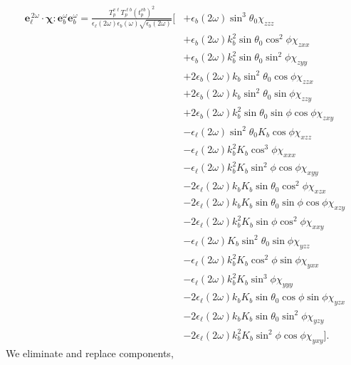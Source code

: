 \begin{equation*}
\begin{split}
\mathbf{e}^{\,2\omega}_{\ell}\cdot
\boldsymbol{\chi}:\mathbf{e}^{\omega}_{b}\mathbf{e}^{\omega}_{b} = 
\frac{T^{v\ell}_{p}T^{\ell b}_{p}\left(t^{vb}_{p}\right)^{2}}
     {\epsilon_{\ell}({2\omega})\epsilon_{b}(\omega)\sqrt{\epsilon_{b}(2\omega)}}
\bigg[
&+ \epsilon_{b}(2\omega)\sin^{3}\theta_{0}\chi_{zzz}\\
&+ \epsilon_{b}(2\omega)k^{2}_{b}\sin\theta_{0}\cos^{2}\phi\chi_{zxx}\\
&+ \epsilon_{b}(2\omega)k^{2}_{b}\sin\theta_{0}\sin^{2}\phi\chi_{zyy}\\
&+ 2\epsilon_{b}(2\omega)k_{b}\sin^{2}\theta_{0}\cos\phi\chi_{zzx}\\
&+ 2\epsilon_{b}(2\omega)k_{b}\sin^{2}\theta_{0}\sin\phi\chi_{zzy}\\
&+ 2\epsilon_{b}(2\omega)k^{2}_{b}\sin\theta_{0}\sin\phi\cos\phi\chi_{zxy}\\
&- \epsilon_{\ell}(2\omega)\sin^{2}\theta_{0}K_{b}\cos\phi\chi_{xzz}\\
&- \epsilon_{\ell}(2\omega)k^{2}_{b}K_{b}\cos^{3}\phi\chi_{xxx}\\
&- \epsilon_{\ell}(2\omega)k^{2}_{b}K_{b}\sin^{2}\phi\cos\phi\chi_{xyy}\\
&- 2\epsilon_{\ell}(2\omega)k_{b}K_{b}\sin\theta_{0}\cos^{2}\phi\chi_{xzx}\\
&- 2\epsilon_{\ell}(2\omega)k_{b}K_{b}\sin\theta_{0}\sin\phi\cos\phi\chi_{xzy}\\
&- 2\epsilon_{\ell}(2\omega)k^{2}_{b}K_{b}\sin\phi\cos^{2}\phi\chi_{xxy}\\
&- \epsilon_{\ell}(2\omega)K_{b}\sin^{2}\theta_{0}\sin\phi\chi_{yzz}\\
&- \epsilon_{\ell}(2\omega)k^{2}_{b}K_{b}\cos^{2}\phi\sin\phi\chi_{yxx}\\
&- \epsilon_{\ell}(2\omega)k^{2}_{b}K_{b}\sin^{3}\phi\chi_{yyy}\\
&- 2\epsilon_{\ell}(2\omega)k_{b}K_{b}\sin\theta_{0}\cos\phi\sin\phi\chi_{yzx}\\
&- 2\epsilon_{\ell}(2\omega)k_{b}K_{b}\sin\theta_{0}\sin^{2}\phi\chi_{yzy}\\
&- 2\epsilon_{\ell}(2\omega)k^{2}_{b}K_{b}\sin^{2}\phi\cos\phi\chi_{yxy}
\bigg].
\end{split}
\end{equation*}
We eliminate and replace components,
